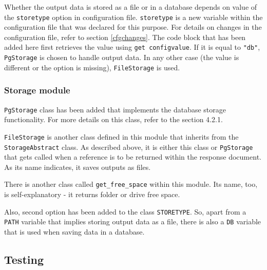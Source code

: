 Whether the output data is stored as a file or in a database depends
on value of the \texttt{store\textunderscore type} option in
configuration file. \texttt{store\textunderscore type} is a new
variable within the configuration file that was declared for
this purpose. For details on changes in the configuration file,
refer to section \ref{cfgchanges}. The code block that has been added here
first retrieves the value using \texttt{get\textunderscore
  config\textunderscore value}. If it is equal to \texttt{"db"},
\texttt{PgStorage} is chosen to handle output data. In any other case
(the value is different or the option is missing),
\texttt{FileStorage} is used.

\subsubsection{Storage module}

\texttt{PgStorage} class has been added that implements the
database storage functionality. For more details on this class,
refer to the section 4.2.1. 

\texttt{FileStorage} is another class defined in this module that inherits 
from \linebreak the \texttt{StorageAbstract} class. As described above, 
it is either this class or  \texttt{PgStorage} that gets called 
when a reference is to be returned within the response document. 
As its name indicates, it saves outputs as files.

There is another class called \texttt{get\_free\_space} within
this module. Its name, too, is self-explanatory - it returns
folder or drive free space.

Also, second option has been added to the class
\texttt{STORE\textunderscore TYPE}.  So, apart from a \texttt{PATH}
variable that implies storing output data as a file, there is also a
\texttt{DB} variable that is used when saving data in a database.

\subsection{Testing} 

